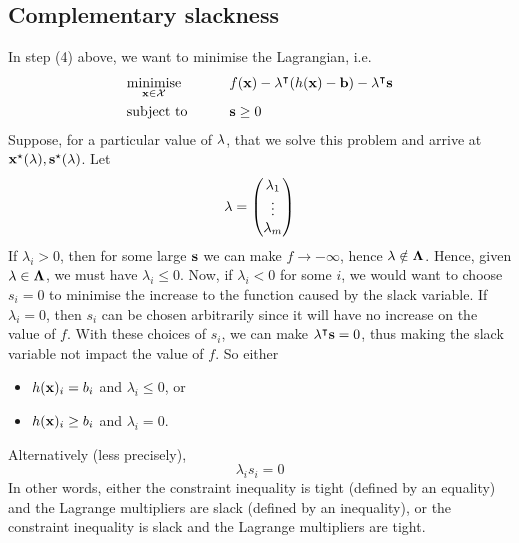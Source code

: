 \subsection{Complementary slackness}
In step (4) above, we want to minimise the Lagrangian, i.e.
\begin{alignat*}{2}
	 & \underset{\vb x \in \mathcal X}{\text{minimise}} & \qquad & f(\vb x) - \vb \lambda^\intercal (h(\vb x) - \vb b) - \vb \lambda^\intercal \vb s \\
	 & \text{subject to}                                &        & \vb s \geq 0
\end{alignat*}
Suppose, for a particular value of \(\vb \lambda\), that we solve this problem and arrive at \(\vb x^\star(\vb \lambda), \vb s^\star(\vb \lambda)\).
Let
\[
	\vb \lambda = \begin{pmatrix}
		\lambda_1 \\ \vdots \\ \lambda_m
	\end{pmatrix}
\]
If \(\lambda_i > 0\), then for some large \(\vb s\) we can make \(f \to -\infty\), hence \(\vb \lambda \notin \vb \Lambda\).
Hence, given \(\vb \lambda \in \vb \Lambda\), we must have \(\lambda_i \leq 0\).
Now, if \(\lambda_i < 0\) for some \(i\), we would want to choose \(s_i = 0\) to minimise the increase to the function caused by the slack variable.
If \(\lambda_i = 0\), then \(s_i\) can be chosen arbitrarily since it will have no increase on the value of \(f\).
With these choices of \(s_i\), we can make \(\vb \lambda^\intercal \vb s = 0\), thus making the slack variable not impact the value of \(f\).
So either
\begin{itemize}
	\item \(h(\vb x)_i = b_i\) and \(\lambda_i \leq 0\), or
	\item \(h(\vb x)_i \geq b_i\) and \(\lambda_i = 0\).
\end{itemize}
Alternatively (less precisely),
\[
	\lambda_i s_i = 0
\]
In other words, either the constraint inequality is tight (defined by an equality) and the Lagrange multipliers are slack (defined by an inequality), or the constraint inequality is slack and the Lagrange multipliers are tight.

